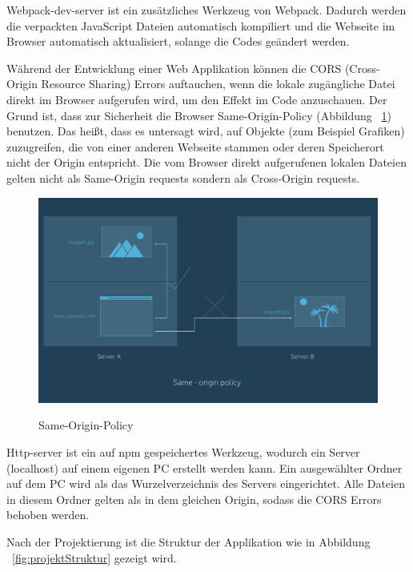  Webpack-dev-server ist ein zusätzliches Werkzeug von Webpack. Dadurch werden die verpackten JavaScript Dateien automatisch kompiliert und die Webseite im Browser automatisch aktualisiert, solange die Codes geändert werden.
 
 Während der Entwicklung einer Web Applikation können die CORS (Cross-Origin Resource Sharing) Errors auftauchen, wenn die lokale zugängliche Datei direkt im Browser aufgerufen wird, um den Effekt im Code anzuschauen. Der Grund ist, dass zur Sicherheit die Browser Same-Origin-Policy (Abbildung ~\ref{fig:Same-Origin-Policy}) benutzen. Das heißt, dass es untersagt wird, auf Objekte (zum Beispiel Grafiken) zuzugreifen, die von einer anderen Webseite stammen oder deren Speicherort nicht der Origin entspricht. Die vom Browser direkt aufgerufenen lokalen Dateien gelten nicht als Same-Origin requests sondern als Cross-Origin requests.
 
\begin{figure}[ht]
\centering
\caption[Same-Origin-Policy]{Same-Origin-Policy}
\includegraphics[width=\textwidth]{images/sameOrigin.png}
\label{fig:Same-Origin-Policy}
\end{figure}
 
 Http-server ist ein auf npm gespeichertes Werkzeug, wodurch ein Server (localhost) auf einem eigenen PC erstellt werden kann. Ein ausgewählter Ordner auf dem PC wird als das Wurzelverzeichnis des Servers eingerichtet. Alle Dateien in diesem Ordner gelten als in dem gleichen Origin, sodass die CORS Errors behoben werden.
 
 Nach der Projektierung ist die Struktur der Applikation wie in Abbildung ~\ref{fig:projektStruktur} gezeigt wird.
 
